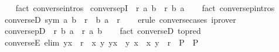 \begin{isabellebody}
%
\isadelimproof
\ \ %
\endisadelimproof
%
\isatagproof
{}\isamarkupfalse%
\ {\isacharparenleft}{\kern0pt}fact\ converse{\isachardot}{\kern0pt}intros{\isacharparenright}{\kern0pt}%
\endisatagproof
{\isafoldproof}%
%
\isadelimproof
\isanewline
%
\endisadelimproof
\isanewline
{}\isamarkupfalse%
\ conversepI\ {\isacharcolon}{\kern0pt}\ {\isachardoublequoteopen}r\ a\ b\ {\isasymLongrightarrow}\ r{\isasyminverse}{\isasyminverse}\ b\ a{\isachardoublequoteclose}\isanewline
%
\isadelimproof
\ \ %
\endisadelimproof
%
\isatagproof
{}\isamarkupfalse%
\ {\isacharparenleft}{\kern0pt}fact\ conversep{\isachardot}{\kern0pt}intros{\isacharparenright}{\kern0pt}%
\endisatagproof
{\isafoldproof}%
%
\isadelimproof
\isanewline
%
\endisadelimproof
\isanewline
{}\isamarkupfalse%
\ converseD\ {\isacharbrackleft}{\kern0pt}sym{\isacharbrackright}{\kern0pt}{\isacharcolon}{\kern0pt}\ {\isachardoublequoteopen}{\isacharparenleft}{\kern0pt}a{\isacharcomma}{\kern0pt}\ b{\isacharparenright}{\kern0pt}\ {\isasymin}\ r{\isasyminverse}\ {\isasymLongrightarrow}\ {\isacharparenleft}{\kern0pt}b{\isacharcomma}{\kern0pt}\ a{\isacharparenright}{\kern0pt}\ {\isasymin}\ r{\isachardoublequoteclose}\isanewline
%
\isadelimproof
\ \ %
\endisadelimproof
%
\isatagproof
{}\isamarkupfalse%
\ {\isacharparenleft}{\kern0pt}erule\ converse{\isachardot}{\kern0pt}cases{\isacharparenright}{\kern0pt}\ iprover%
\endisatagproof
{\isafoldproof}%
%
\isadelimproof
\isanewline
%
\endisadelimproof
\isanewline
{}\isamarkupfalse%
\ conversepD\ {\isacharcolon}{\kern0pt}\ {\isachardoublequoteopen}r{\isasyminverse}{\isasyminverse}\ b\ a\ {\isasymLongrightarrow}\ r\ a\ b{\isachardoublequoteclose}\isanewline
%
\isadelimproof
\ \ %
\endisadelimproof
%
\isatagproof
{}\isamarkupfalse%
\ {\isacharparenleft}{\kern0pt}fact\ converseD\ {\isacharbrackleft}{\kern0pt}to{\isacharunderscore}{\kern0pt}pred{\isacharbrackright}{\kern0pt}{\isacharparenright}{\kern0pt}%
\endisatagproof
{\isafoldproof}%
%
\isadelimproof
\isanewline
%
\endisadelimproof
\isanewline
{}\isamarkupfalse%
\ converseE\ {\isacharbrackleft}{\kern0pt}elim{\isacharbang}{\kern0pt}{\isacharbrackright}{\kern0pt}{\isacharcolon}{\kern0pt}\ {\isachardoublequoteopen}yx\ {\isasymin}\ r{\isasyminverse}\ {\isasymLongrightarrow}\ {\isacharparenleft}{\kern0pt}{\isasymAnd}x\ y{\isachardot}{\kern0pt}\ yx\ {\isacharequal}{\kern0pt}\ {\isacharparenleft}{\kern0pt}y{\isacharcomma}{\kern0pt}\ x{\isacharparenright}{\kern0pt}\ {\isasymLongrightarrow}\ {\isacharparenleft}{\kern0pt}x{\isacharcomma}{\kern0pt}\ y{\isacharparenright}{\kern0pt}\ {\isasymin}\ r\ {\isasymLongrightarrow}\ P{\isacharparenright}{\kern0pt}\ {\isasymLongrightarrow}\ P{\isachardoublequoteclose}\isanewline

\end{isabellebody}
